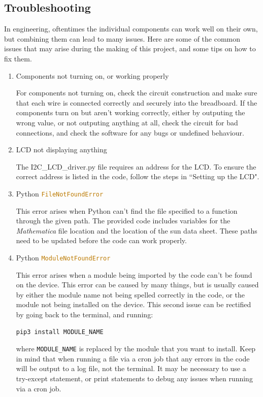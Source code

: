\documentclass[titlepage]{article}
\begin{document}
\subsection*{Troubleshooting}
In engineering, oftentimes the individual components can work well on their own, but combining them can lead to many issues. Here are some of the common issues that may arise during the making of this project, and some tips on how to fix them. \par
\begin{enumerate}
    \item Components not turning on, or working properly \par
    For components not turning on, check the circuit construction and make sure that each wire is connected correctly and securely into the breadboard. If the components turn on but aren't working correctly, either by outputing the wrong value, or not outputing anything at all, check the circuit for bad connections, and check the software for any bugs or undefined behaviour.
    \item LCD not displaying anything \par
    The I2C\_LCD\_driver.py file requires an address for the LCD. To ensure the correct address is listed in the code, follow the steps in ``Setting up the LCD". 
    \item Python \lstinline[language=Python]{FileNotFoundError} \par
    This error arises when Python can't find the file specified to a function through the given path. The provided code includes variables for the \textit{Mathematica} file location and the location of the sun data sheet. These paths need to be updated before the code can work properly. 
    \item Python \lstinline[language=Python]{ModuleNotFoundError} \par
    This error arises when a module being imported by the code can't be found on the device. This error can be caused by many things, but is usually caused by either the module name not being spelled correctly in the code, or the module not being installed on the device. This second issue can be rectified by going back to the terminal, and running:
    \begin{lstlisting}[language=bash]
pip3 install MODULE_NAME \end{lstlisting}
    where \lstinline[language=Python]{MODULE_NAME} is replaced by the module that you want to install. Keep in mind that when running a file via a cron job that any errors in the code will be output to a log file, not the terminal. It may be necessary to use a try-except statement, or print statements to debug any issues when running via a cron job. 

\end{enumerate}
\end{document}
